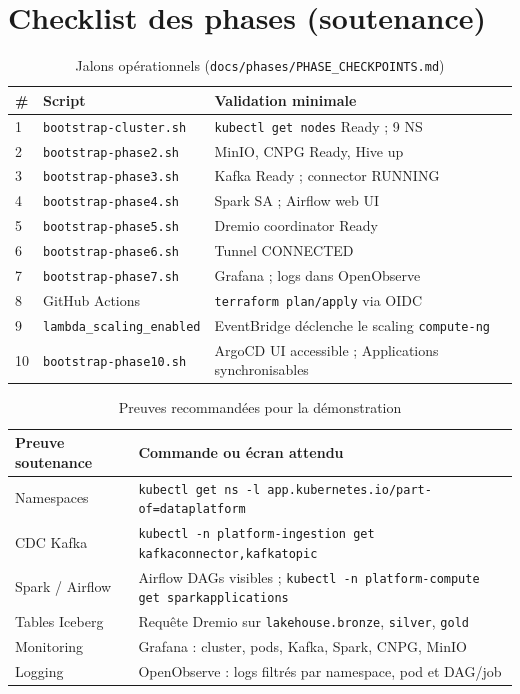 \chapter{Checklist des phases (soutenance)}
\label{ann:phases}

\begin{table}[H]
\centering
\footnotesize
\begin{tabular}{@{}p{}p{}p{}@{}}
\toprule
\textbf{\#} & \textbf{Script} & \textbf{Validation minimale} \\
\midrule
1 & \texttt{bootstrap-cluster.sh} & \texttt{kubectl get nodes} Ready ; 9 NS \\
2 & \texttt{bootstrap-phase2.sh} & MinIO, CNPG Ready, Hive up \\
3 & \texttt{bootstrap-phase3.sh} & Kafka Ready ; connector RUNNING \\
4 & \texttt{bootstrap-phase4.sh} & Spark SA ; Airflow web UI \\
5 & \texttt{bootstrap-phase5.sh} & Dremio coordinator Ready \\
6 & \texttt{bootstrap-phase6.sh} & Tunnel CONNECTED \\
7 & \texttt{bootstrap-phase7.sh} & Grafana ; logs dans OpenObserve \\
8 & GitHub Actions & \texttt{terraform plan/apply} via OIDC \\
9 & \texttt{lambda\_scaling\_enabled} & EventBridge déclenche le scaling \texttt{compute-ng} \\
10 & \texttt{bootstrap-phase10.sh} & ArgoCD UI accessible ; Applications synchronisables \\
\bottomrule
\end{tabular}
\caption{Jalons opérationnels (\texttt{docs/phases/PHASE\_CHECKPOINTS.md})}
\end{table}

\begin{table}[H]
\centering
\footnotesize
\begin{tabular}{@{}p{}p{}@{}}
\toprule
\textbf{Preuve soutenance} & \textbf{Commande ou écran attendu} \\
\midrule
Namespaces & \texttt{kubectl get ns -l app.kubernetes.io/part-of=dataplatform} \\
CDC Kafka & \texttt{kubectl -n platform-ingestion get kafkaconnector,kafkatopic} \\
Spark / Airflow & Airflow DAGs visibles ; \texttt{kubectl -n platform-compute get sparkapplications} \\
Tables Iceberg & Requête Dremio sur \texttt{lakehouse.bronze}, \texttt{silver}, \texttt{gold} \\
Monitoring & Grafana : cluster, pods, Kafka, Spark, CNPG, MinIO \\
Logging & OpenObserve : logs filtrés par namespace, pod et DAG/job \\
\bottomrule
\end{tabular}
\caption{Preuves recommandées pour la démonstration}
\end{table}

